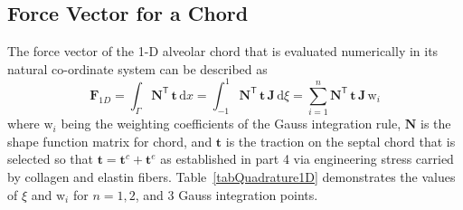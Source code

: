 \subsection{Force Vector for a Chord}

The force vector of the 1-D alveolar chord that is evaluated numerically in its natural co-ordinate system can be described as
\begin{equation}
\mathbf{F}_{1D} = \int_{\Gamma} \mathbf{N}^{\mathsf{T}} \, \mathbf{t} \, \mathrm{d} x  = \int_{-1}^{1} \mathbf{N}^{\mathsf{T}}\, \mathbf{t} \, \mathbf{J}\,  \mathrm{d} \xi =  \sum_{i=1}^{n} \mathbf{N}^{\mathsf{T}} \, \mathbf{t} \, \mathbf{J} \, \mathrm{w}_i
\end{equation}
where $\mathrm{w}_i$ being the  weighting coefficients of the Gauss integration rule, $\mathbf{N}$ is the shape function matrix for chord, and $\mathbf{t}$ is the traction on the septal chord that is selected so that $\mathbf{t} = \mathbf{t}^c + \mathbf{t}^e $ as established in part 4 via engineering stress carried by collagen and elastin fibers.
Table~\ref{tabQuadrature1D} demonstrates the values of $\xi$ and $\mathrm{w}_i$ for $n = 1, 2$, and $3$ Gauss integration points.

